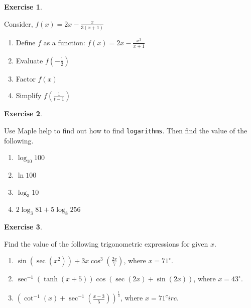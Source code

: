 \documentclass[
]{book}
\providecommand{\tightlist}{%
  \setlength{\itemsep}{0pt}\setlength{\parskip}{0pt}}
\theoremstyle{definition}
\theoremstyle{definition}
\theoremstyle{definition}
\newtheorem{exercise}{Exercise}[chapter]
\theoremstyle{definition}
\theoremstyle{remark}
\begin{document}
\begin{exercise}
\protect\hypertarget{exr:unnamed-chunk-58}{}\label{exr:unnamed-chunk-58}

Consider, \(f(x) = 2x -\frac{x}{3(x+1)}\)

\begin{enumerate}
\def\labelenumi{\roman{enumi}.}
\tightlist
\item
  Define \(f\) as a function: \(f(x) = 2x - \frac{x^3}{x+1}\)
\item
  Evaluate \(f(-\frac{1}{2})\)
\item
  Factor \(f(x)\)
\item
  Simplify \(f(\frac{1}{t-1})\)
\end{enumerate}

\end{exercise}

\begin{exercise}
\protect\hypertarget{exr:unnamed-chunk-59}{}\label{exr:unnamed-chunk-59}

Use Maple help to find out how to find \texttt{logarithms}. Then find the value of the following.

\begin{enumerate}
\def\labelenumi{\roman{enumi}.}
\tightlist
\item
  \(\log_{10} 100\)
\item
  \(\ln 100\)
\item
  \(\log_3 10\)
\item
  \(2\log_3 81 + 5\log_8 256\)
\end{enumerate}

\end{exercise}

\begin{exercise}
\protect\hypertarget{exr:unnamed-chunk-60}{}\label{exr:unnamed-chunk-60}

Find the value of the following trigonometric expressions for given \(x\).

\begin{enumerate}
\def\labelenumi{\roman{enumi}.}
\tightlist
\item
  \(\sin(\sec(x^2)) + 3x\cos^3(\frac{2x}{7})\), where \(x = 71^\circ\).
\item
  \(\sec^{-1}(\tanh(x+5))\cos(\sec(2x) + \sin(2x))\), where \(x = 43^\circ\).
\item
  \(\left(\cot^{-1}(x) + \sec^{-1}(\frac{x-3}{5})\right)^{\frac{1}{3}}\), where \(x = 71^circ\).
\end{enumerate}

\end{exercise}
\end{document}
